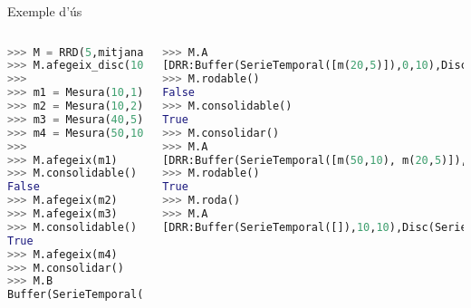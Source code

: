 \begin{frame}[fragile] 
{Exemple d'ús}

\begin{columns}
\column{5cm}

\begin{lstlisting}[language=python]
>>> M = RRD(5,mitjana)
>>> M.afegeix_disc(10,2,mitjana)
>>>
>>> m1 = Mesura(10,1)
>>> m2 = Mesura(10,2)
>>> m3 = Mesura(40,5) 
>>> m4 = Mesura(50,10)
>>>
>>> M.afegeix(m1)
>>> M.consolidable()
False
>>> M.afegeix(m2)
>>> M.afegeix(m3)
>>> M.consolidable()
True
>>> M.afegeix(m4)
>>> M.consolidar()
>>> M.B
Buffer(SerieTemporal([m(50,10)]),5,5)
\end{lstlisting}

\column{6cm}
\begin{lstlisting}[language=python]
>>> M.A
[DRR:Buffer(SerieTemporal([m(20,5)]),0,10),Disc(SerieTemporal([]), |2|)]
>>> M.rodable()
False
>>> M.consolidable()
True
>>> M.consolidar()
>>> M.A
[DRR:Buffer(SerieTemporal([m(50,10), m(20,5)]),0,10),Disc(SerieTemporal([]), |2|)]
>>> M.rodable()
True
>>> M.roda()
>>> M.A
[DRR:Buffer(SerieTemporal([]),10,10),Disc(SerieTemporal([m(35,10)]), |2|)]
\end{lstlisting}

\end{columns}

\end{frame}






